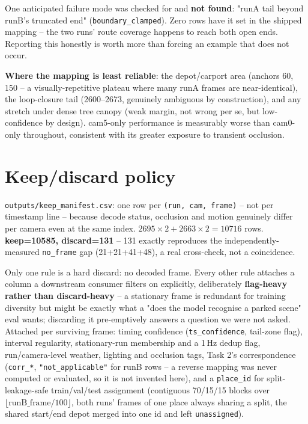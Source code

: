 \documentclass[11pt,a4paper]{article}
\begin{document}
One anticipated failure mode was checked for and \textbf{not found}: "runA tail beyond runB's
truncated end" (\texttt{boundary\_clamped}). Zero rows have it set in the shipped mapping -- the
two runs' route coverage happens to reach both open ends. Reporting this honestly is worth more
than forcing an example that does not occur.

\textbf{Where the mapping is least reliable}: the depot/carport area (anchors 60, 150 -- a
visually-repetitive plateau where many runA frames are near-identical), the loop-closure tail
(2600--2673, genuinely ambiguous by construction), and any stretch under dense tree canopy (weak
margin, not wrong per se, but low-confidence by design). cam5-only performance is measurably worse
than cam0-only throughout, consistent with its greater exposure to transient occlusion.

\section{Keep/discard policy}
\label{sec:t3}

\texttt{outputs/keep\_manifest.csv}: one row per \texttt{(run, cam, frame)} -- not per timestamp
line -- because decode status, occlusion and motion genuinely differ per camera even at the same
index. $2695{\times}2 + 2663{\times}2 = 10716$ rows. \textbf{keep=10585, discard=131} -- 131 exactly
reproduces the independently-measured \texttt{no\_frame} gap (21+21+41+48), a real cross-check, not a
coincidence.

Only one rule is a hard discard: no decoded frame. Every other rule attaches a column a downstream
consumer filters on explicitly, deliberately \textbf{flag-heavy rather than discard-heavy} -- a
stationary frame is redundant for training diversity but might be exactly what a "does the model
recognise a parked scene" eval wants; discarding it pre-emptively answers a question we were not
asked. Attached per surviving frame: timing confidence (\texttt{ts\_confidence}, tail-zone flag),
interval regularity, stationary-run membership and a 1\,Hz dedup flag, run/camera-level weather,
lighting and occlusion tags, Task 2's correspondence (\texttt{corr\_*}, \texttt{"not\_applicable"}
for runB rows -- a reverse mapping was never computed or evaluated, so it is not invented here),
and a \texttt{place\_id} for split-leakage-safe train/val/test assignment (contiguous 70/15/15
blocks over $\lfloor \text{runB\_frame}/100\rfloor$, both runs' frames of one place always sharing
a split, the shared start/end depot merged into one id and left \texttt{unassigned}).
\end{document}
